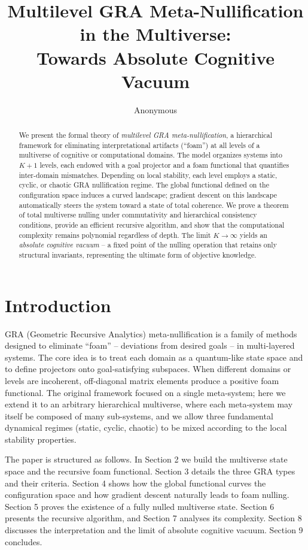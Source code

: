 \documentclass[12pt,a4paper]{article}
\title{\textbf{Multilevel GRA Meta-Nullification in the Multiverse:\\ Towards Absolute Cognitive Vacuum}}
\author{Anonymous}
\date{}
\begin{document}
\maketitle

\begin{abstract}
We present the formal theory of \emph{multilevel GRA meta-nullification}, a hierarchical framework for eliminating interpretational artifacts (``foam'') at all levels of a multiverse of cognitive or computational domains. The model organizes systems into $K+1$ levels, each endowed with a goal projector and a foam functional that quantifies inter-domain mismatches. Depending on local stability, each level employs a static, cyclic, or chaotic GRA nullification regime. The global functional defined on the configuration space induces a curved landscape; gradient descent on this landscape automatically steers the system toward a state of total coherence. We prove a theorem of total multiverse nulling under commutativity and hierarchical consistency conditions, provide an efficient recursive algorithm, and show that the computational complexity remains polynomial regardless of depth. The limit $K\to\infty$ yields an \emph{absolute cognitive vacuum} – a fixed point of the nulling operation that retains only structural invariants, representing the ultimate form of objective knowledge.
\end{abstract}

\section{Introduction}
GRA (Geometric Recursive Analytics) meta-nullification is a family of methods designed to eliminate ``foam'' – deviations from desired goals – in multi-layered systems. The core idea is to treat each domain as a quantum-like state space and to define projectors onto goal-satisfying subspaces. When different domains or levels are incoherent, off-diagonal matrix elements produce a positive foam functional. The original framework focused on a single meta-system; here we extend it to an arbitrary hierarchical multiverse, where each meta-system may itself be composed of many sub-systems, and we allow three fundamental dynamical regimes (static, cyclic, chaotic) to be mixed according to the local stability properties.

The paper is structured as follows. In Section 2 we build the multiverse state space and the recursive foam functional. Section 3 details the three GRA types and their criteria. Section 4 shows how the global functional curves the configuration space and how gradient descent naturally leads to foam nulling. Section 5 proves the existence of a fully nulled multiverse state. Section 6 presents the recursive algorithm, and Section 7 analyses its complexity. Section 8 discusses the interpretation and the limit of absolute cognitive vacuum. Section 9 concludes.
\end{document}
